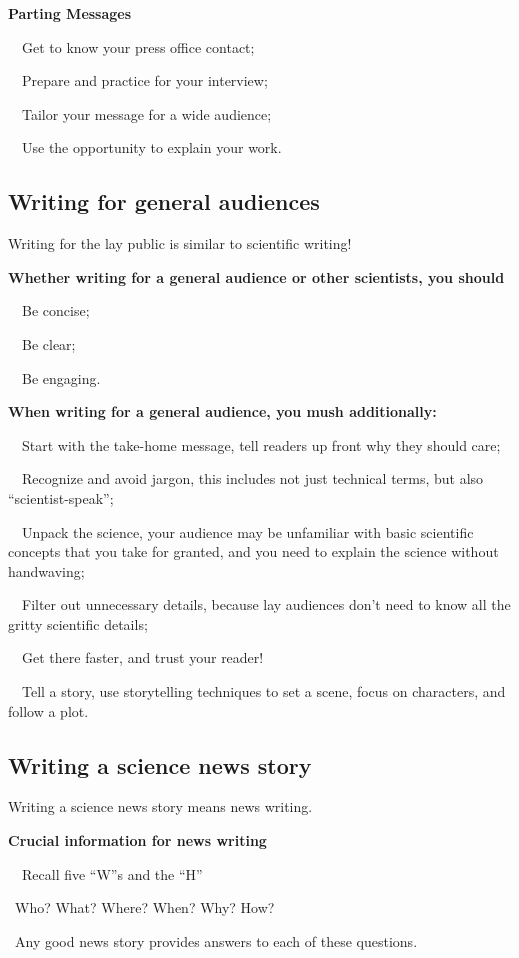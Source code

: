 \documentclass[a4paper, 12pt]{article}
\begin{document}
\textbf{Parting Messages}
\par\ \textbullet\ Get to know your press office contact;
\par\ \textbullet\ Prepare and practice for your interview;
\par\ \textbullet\ Tailor your message for a wide audience;
\par\ \textbullet\ Use the opportunity to explain your work.

\newpage\subsection{Writing for general audiences}

Writing for the lay public is similar to scientific writing!

\textbf{Whether writing for a general audience or other scientists, you should}
\par\ \textbullet\ Be concise;
\par\ \textbullet\ Be clear;
\par\ \textbullet\ Be engaging.

\textbf{When writing for a general audience, you mush additionally:}
\par\ \textbullet\ Start with the take-home message, tell readers up front why they should care;
\par\ \textbullet\ Recognize and avoid jargon, this includes not just technical terms, but also ``scientist-speak'';
\par\ \textbullet\ Unpack the science, your audience may be unfamiliar with basic scientific concepts that you take for granted, and you need to explain the science without handwaving;
\par\ \textbullet\ Filter out unnecessary details, because lay audiences don't need to know all the gritty scientific details;
\par\ \textbullet\ Get there faster, and trust your reader!
\par\ \textbullet\ Tell a story, use storytelling techniques to set a scene, focus on characters, and follow a plot.

\newpage\subsection{Writing a science news story}

Writing a science news story means news writing.

\textbf{Crucial information for news writing}
\par\ \textbullet\ Recall five ``W''s and the ``H''
\par\quad\textopenbullet\ Who? What? Where? When? Why? How?
\par\quad\textopenbullet\ Any good news story provides answers to each of these questions.
\end{document}
